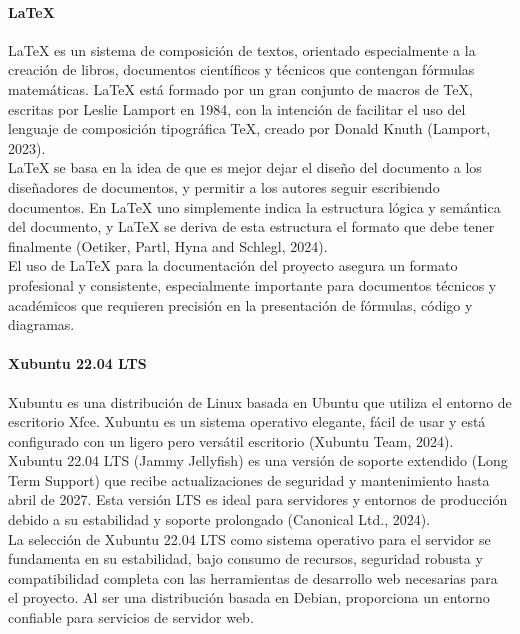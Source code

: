 \documentclass[12pt, letterpaper]{article}
\begin{document}
\paragraph{\textbf{LaTeX}}
LaTeX es un sistema de composición de textos, orientado especialmente a la creación de libros, documentos científicos y técnicos que contengan fórmulas matemáticas. LaTeX está formado por un gran conjunto de macros de TeX, escritas por Leslie Lamport en 1984, con la intención de facilitar el uso del lenguaje de composición tipográfica TeX, creado por Donald Knuth (Lamport, 2023).\\
LaTeX se basa en la idea de que es mejor dejar el diseño del documento a los diseñadores de documentos, y permitir a los autores seguir escribiendo documentos. En LaTeX uno simplemente indica la estructura lógica y semántica del documento, y LaTeX se deriva de esta estructura el formato que debe tener finalmente (Oetiker, Partl, Hyna and Schlegl, 2024).\\
El uso de LaTeX para la documentación del proyecto asegura un formato profesional y consistente, especialmente importante para documentos técnicos y académicos que requieren precisión en la presentación de fórmulas, código y diagramas.\\
\paragraph{\textbf{Xubuntu 22.04 LTS}}
Xubuntu es una distribución de Linux basada en Ubuntu que utiliza el entorno de escritorio Xfce. Xubuntu es un sistema operativo elegante, fácil de usar y está configurado con un ligero pero versátil escritorio (Xubuntu Team, 2024).\\
Xubuntu 22.04 LTS (Jammy Jellyfish) es una versión de soporte extendido (Long Term Support) que recibe actualizaciones de seguridad y mantenimiento hasta abril de 2027. Esta versión LTS es ideal para servidores y entornos de producción debido a su estabilidad y soporte prolongado (Canonical Ltd., 2024).\\
La selección de Xubuntu 22.04 LTS como sistema operativo para el servidor se fundamenta en su estabilidad, bajo consumo de recursos, seguridad robusta y compatibilidad completa con las herramientas de desarrollo web necesarias para el proyecto. Al ser una distribución basada en Debian, proporciona un entorno confiable para servicios de servidor web.\\
\end{document}
